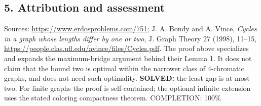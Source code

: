 \subsection*{5. Attribution and assessment}
Sources: \url{https://www.erdosproblems.com/751}; J. A. Bondy and A. Vince, \emph{Cycles in a graph whose lengths differ by one or two}, J. Graph Theory 27 (1998), 11--15, \url{https://people.clas.ufl.edu/avince/files/Cycles.pdf}. The proof above specializes and expands the maximum-bridge argument behind their Lemma 1. It does not claim that the bound two is optimal within the narrower class of $4$-chromatic graphs, and does not need such optimality.
\textbf{SOLVED:} the least gap is at most two. For finite graphs the proof is self-contained; the optional infinite extension uses the stated coloring compactness theorem.
\noindent COMPLETION: 100\%

